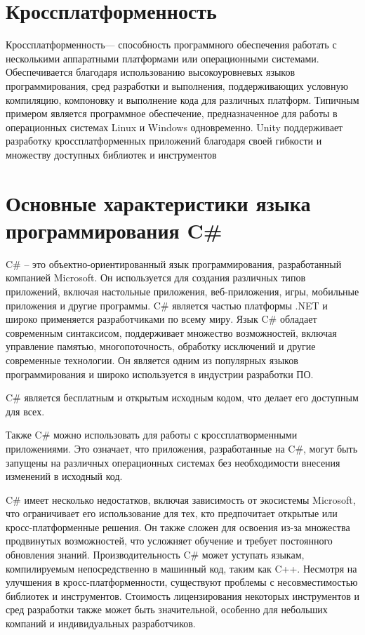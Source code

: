 \section{\label{sec:ch01/sec02}Кроссплатформенность}

Кроссплатформенность— способность программного обеспечения работать с несколькими аппаратными платформами или операционными системами. Обеспечивается благодаря использованию высокоуровневых
языков программирования, сред разработки и выполнения, поддерживающих
условную компиляцию, компоновку и выполнение кода для различных платформ. Типичным примером является программное обеспечение, предназначенное для работы в операционных системах Linux и Windows одновременно.
Unity поддерживает разработку кроссплатформенных приложений
благодаря своей гибкости и множеству доступных библиотек и инструментов

\section{\label{sec:ch01/sec02}Основные характеристики языка программирования C\#}
C\# – это объектно-ориентированный язык программирования, разработанный компанией Microsoft. Он используется для создания различных типов приложений, включая настольные приложения, веб-приложения, игры, мобильные приложения и другие программы. C\# является частью платформы .NET и широко применяется разработчиками по всему миру. Язык C\# обладает современным синтаксисом, поддерживает множество возможностей, включая управление памятью, многопоточность, обработку исключений и другие современные технологии. Он является одним из популярных языков программирования и широко используется в индустрии разработки ПО.

C\# является бесплатным и открытым исходным кодом, что делает
его доступным для всех.

Также C\# можно использовать для работы с кроссплатворменными приложениями. Это означает, что приложения, разработанные на C\#, могут быть запущены на различных операционных системах без необходимости внесения изменений в исходный код.

C\# имеет несколько недостатков, включая зависимость от экосистемы Microsoft, что ограничивает его использование для тех, кто предпочитает открытые или кросс-платформенные решения. Он также сложен для освоения из-за множества продвинутых возможностей, что усложняет обучение и требует постоянного обновления знаний. Производительность C\# может уступать языкам, компилируемым непосредственно в машинный код, таким как C++. Несмотря на улучшения в кросс-платформенности, существуют проблемы с несовместимостью библиотек и инструментов. Стоимость лицензирования некоторых инструментов и сред разработки также может быть значительной, особенно для небольших компаний и индивидуальных разработчиков.

